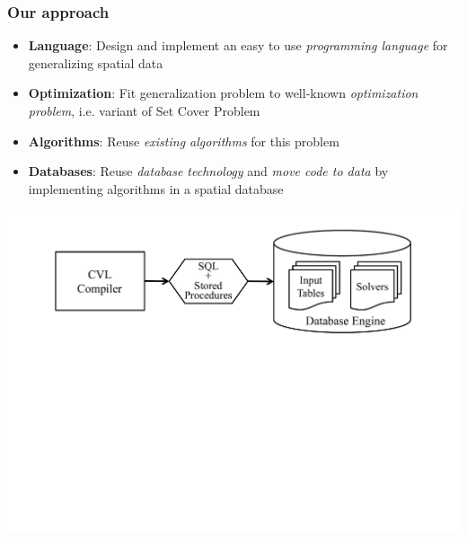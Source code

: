 \documentclass{beamer}
\begin{document}
\frame
{
  \frametitle{Our approach}
  \begin{itemize}
  \item \textbf{Language}: Design and implement an easy to use \emph{programming language} for generalizing spatial data 
  \item \textbf{Optimization}: Fit generalization problem to well-known \emph{optimization problem}, i.e. variant of Set Cover Problem~\cite{vazirani}
  \item \textbf{Algorithms}: Reuse \emph{existing algorithms} for this problem
  \item \textbf{Databases}: Reuse \emph{database technology} and \emph{move code to data} by implementing algorithms in a spatial database
  \end{itemize}
  \begin{center}
  \includegraphics[scale=0.3]{figs/indatabase-execution.pdf}
  \end{center}
}
\end{document}
